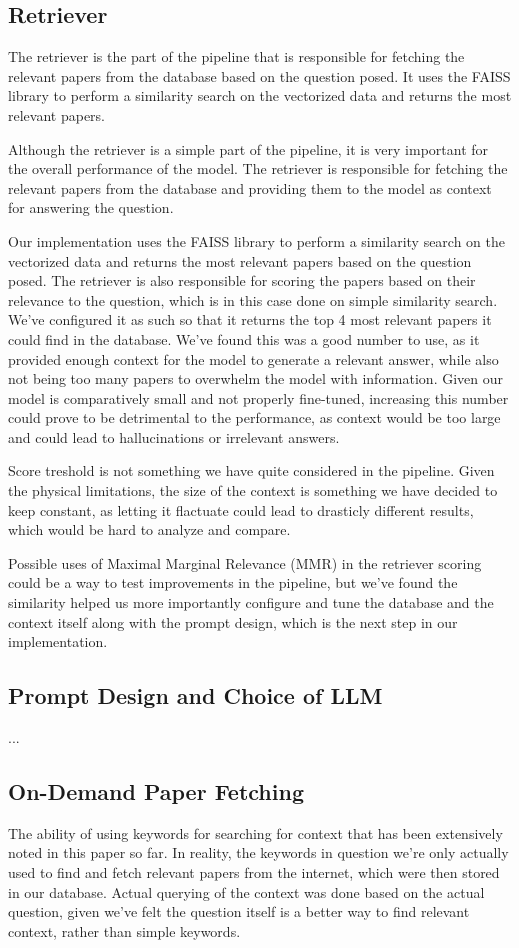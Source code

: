 \documentclass[fleqn,moreauthors,10pt]{ds_report}
\begin{document}
\subsection*{Retriever}
The retriever is the part of the pipeline that is responsible for fetching the relevant papers from the database based on the question posed. It uses the FAISS library to perform a similarity search on the vectorized data and returns the most relevant papers.

Although the retriever is a simple part of the pipeline, it is very important for the overall performance of the model. The retriever is responsible for fetching the relevant papers from the database and providing them to the model as context for answering the question.

Our implementation uses the FAISS library to perform a similarity search on the vectorized data and returns the most relevant papers based on the question posed. The retriever is also responsible for scoring the papers based on their relevance to the question, which is in this case done on simple similarity search. We've configured it as such so that it returns the top 4 most relevant papers it could find in the database. We've found this was a good number to use, as it provided enough context for the model to generate a relevant answer, while also not being too many papers to overwhelm the model with information. Given our model is comparatively small and not properly fine-tuned, increasing this number could prove to be detrimental to the performance, as context would be too large and could lead to hallucinations or irrelevant answers.

Score treshold is not something we have quite considered in the pipeline. Given the physical limitations, the size of the context is something we have decided to keep constant, as letting it flactuate could lead to drasticly different results, which would be hard to analyze and compare.

Possible uses of Maximal Marginal Relevance (MMR) in the retriever scoring could be a way to test improvements in the pipeline, but we've found the similarity helped us more importantly configure and tune the database and the context itself along with the prompt design, which is the next step in our implementation.

\subsection*{Prompt Design and Choice of LLM}
...
\subsection*{On-Demand Paper Fetching}
The ability of using keywords for searching for context that has been extensively noted in this paper so far. In reality, the keywords in question we're only actually used to find and fetch relevant papers from the internet, which were then stored in our database. Actual querying of the context was done based on the actual question, given we've felt the question itself is a better way to find relevant context, rather than simple keywords.
\end{document}
